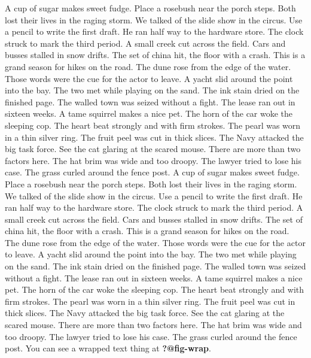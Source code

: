 \documentclass[
  letterpaper,
  DIV=11,
  numbers=noendperiod]{scrartcl}
\begin{document}
A cup of sugar makes sweet fudge. Place a rosebush near the porch steps.
Both lost their lives in the raging storm. We talked of the slide show
in the circus. Use a pencil to write the first draft. He ran half way to
the hardware store. The clock struck to mark the third period. A small
creek cut across the field. Cars and busses stalled in snow drifts. The
set of china hit, the floor with a crash. This is a grand season for
hikes on the road. The dune rose from the edge of the water. Those words
were the cue for the actor to leave. A yacht slid around the point into
the bay. The two met while playing on the sand. The ink stain dried on
the finished page. The walled town was seized without a fight. The lease
ran out in sixteen weeks. A tame squirrel makes a nice pet. The horn of
the car woke the sleeping cop. The heart beat strongly and with firm
strokes. The pearl was worn in a thin silver ring. The fruit peel was
cut in thick slices. The Navy attacked the big task force. See the cat
glaring at the scared mouse. There are more than two factors here. The
hat brim was wide and too droopy. The lawyer tried to lose his case. The
grass curled around the fence post. A cup of sugar makes sweet fudge.
Place a rosebush near the porch steps. Both lost their lives in the
raging storm. We talked of the slide show in the circus. Use a pencil to
write the first draft. He ran half way to the hardware store. The clock
struck to mark the third period. A small creek cut across the field.
Cars and busses stalled in snow drifts. The set of china hit, the floor
with a crash. This is a grand season for hikes on the road. The dune
rose from the edge of the water. Those words were the cue for the actor
to leave. A yacht slid around the point into the bay. The two met while
playing on the sand. The ink stain dried on the finished page. The
walled town was seized without a fight. The lease ran out in sixteen
weeks. A tame squirrel makes a nice pet. The horn of the car woke the
sleeping cop. The heart beat strongly and with firm strokes. The pearl
was worn in a thin silver ring. The fruit peel was cut in thick slices.
The Navy attacked the big task force. See the cat glaring at the scared
mouse. There are more than two factors here. The hat brim was wide and
too droopy. The lawyer tried to lose his case. The grass curled around
the fence post. You can see a wrapped text thing at \textbf{?@fig-wrap}.
\end{document}
